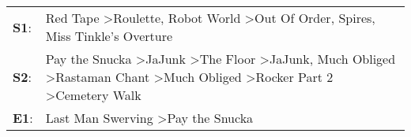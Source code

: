 \begin{supertabular}{p{0.03\textwidth}p{0.92\textwidth}}
 \textbf{S1}:  &                                                                                                                                                                                     Red Tape\textsuperscript{} \textgreater \enspace Roulette\textsuperscript{}, \enspace Robot World\textsuperscript{} \textgreater \enspace Out Of Order\textsuperscript{}, \enspace Spires\textsuperscript{}, \enspace Miss Tinkle's Overture\textsuperscript{}  \enspace  \\
 \textbf{S2}:  &  Pay the Snucka\textsuperscript{} \textgreater \enspace JaJunk\textsuperscript{} \textgreater \enspace The Floor\textsuperscript{} \textgreater \enspace JaJunk\textsuperscript{}, \enspace Much Obliged\textsuperscript{} \textgreater \enspace Rastaman Chant\textsuperscript{} \textgreater \enspace Much Obliged\textsuperscript{} \textgreater \enspace Rocker Part 2\textsuperscript{} \textgreater \enspace Cemetery Walk\textsuperscript{}  \enspace  \\
 \textbf{E1}:  &                                                                                                                                                                                                                                                                                                                                                         Last Man Swerving\textsuperscript{} \textgreater \enspace Pay the Snucka\textsuperscript{}  \enspace  \\
\end{supertabular}
